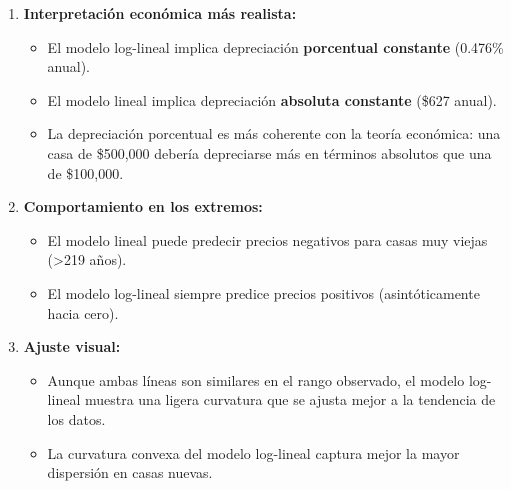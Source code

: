 \documentclass[12pt]{article}
\begin{document}
\begin{enumerate}
    
    \item \textbf{Interpretación económica más realista:}
    \begin{itemize}
        \item El modelo log-lineal implica depreciación \textbf{porcentual constante} (0.476\% anual).
        \item El modelo lineal implica depreciación \textbf{absoluta constante} (\$627 anual).
        \item La depreciación porcentual es más coherente con la teoría económica: una casa de \$500,000 debería depreciarse más en términos absolutos que una de \$100,000.
    \end{itemize}
    
    \item \textbf{Comportamiento en los extremos:}
    \begin{itemize}
        \item El modelo lineal puede predecir precios negativos para casas muy viejas (>219 años).
        \item El modelo log-lineal siempre predice precios positivos (asintóticamente hacia cero).
    \end{itemize}
    
    \item \textbf{Ajuste visual:}
    \begin{itemize}
        \item Aunque ambas líneas son similares en el rango observado, el modelo log-lineal muestra una ligera curvatura que se ajusta mejor a la tendencia de los datos.
        \item La curvatura convexa del modelo log-lineal captura mejor la mayor dispersión en casas nuevas.
    \end{itemize}
\end{enumerate}
\end{document}
